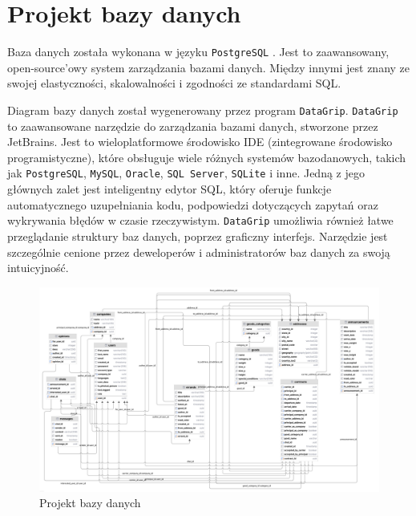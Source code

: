 \section{Projekt bazy danych}
Baza danych została wykonana w języku \texttt{PostgreSQL} \cite{PostgreSQL}. Jest to zaawansowany, open-source'owy system zarządzania bazami danych. Między innymi jest znany ze swojej elastyczności, skalowalności i zgodności ze standardami SQL.

Diagram bazy danych został wygenerowany przez program \texttt{DataGrip}. \texttt{DataGrip} to zaawansowane narzędzie do zarządzania bazami danych, stworzone przez JetBrains. Jest to wieloplatformowe środowisko IDE (zintegrowane środowisko programistyczne), które obsługuje wiele różnych systemów bazodanowych, takich jak \texttt{PostgreSQL}, \texttt{MySQL}, \texttt{Oracle}, \texttt{SQL Server}, \texttt{SQLite} i inne. Jedną z jego głównych zalet jest inteligentny edytor SQL, który oferuje funkcje automatycznego uzupełniania kodu, podpowiedzi dotyczących zapytań oraz wykrywania błędów w czasie rzeczywistym. \texttt{DataGrip} umożliwia również łatwe przeglądanie struktury baz danych, poprzez graficzny interfejs. Narzędzie jest szczególnie cenione przez deweloperów i administratorów baz danych za swoją intuicyjność.

\begin{figure}[H]
	\centering
		\includegraphics[width=1\linewidth]{rozdzial1/baza_danych.jpg}
	\caption{Projekt bazy danych}
	\label{Rys. fig:Projekt bazy danych}
\end{figure}

